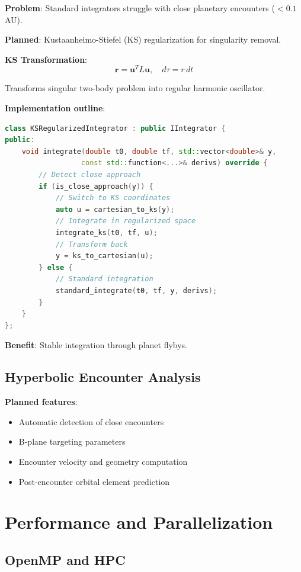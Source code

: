 \textbf{Problem}: Standard integrators struggle with close planetary encounters ($< 0.1$ AU).

\textbf{Planned}: Kustaanheimo-Stiefel (KS) regularization for singularity removal.

\textbf{KS Transformation}:
\[
\mathbf{r} = \mathbf{u}^T L \mathbf{u}, \quad d\tau = r \, dt
\]

Transforms singular two-body problem into regular harmonic oscillator.

\textbf{Implementation outline}:
\begin{lstlisting}[language=C++]
class KSRegularizedIntegrator : public IIntegrator {
public:
    void integrate(double t0, double tf, std::vector<double>& y,
                  const std::function<...>& derivs) override {
        // Detect close approach
        if (is_close_approach(y)) {
            // Switch to KS coordinates
            auto u = cartesian_to_ks(y);
            // Integrate in regularized space
            integrate_ks(t0, tf, u);
            // Transform back
            y = ks_to_cartesian(u);
        } else {
            // Standard integration
            standard_integrate(t0, tf, y, derivs);
        }
    }
};
\end{lstlisting}

\textbf{Benefit}: Stable integration through planet flybys.

\subsection{Hyperbolic Encounter Analysis}

\textbf{Planned features}:
\begin{itemize}
    \item Automatic detection of close encounters
    \item B-plane targeting parameters
    \item Encounter velocity and geometry computation
    \item Post-encounter orbital element prediction
\end{itemize}

\section{Performance and Parallelization}

\subsection{OpenMP and HPC}

